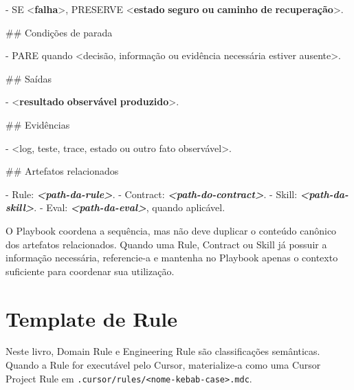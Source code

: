 \documentclass[
  10pt,
  a4paper,
  oneside]{book}
\newenvironment{Shaded}{}{}
\newcommand{\DataTypeTok}[1]{\textcolor[rgb]{0.56,0.13,0.00}{#1}}
\newcommand{\ErrorTok}[1]{\textcolor[rgb]{1.00,0.00,0.00}{\textbf{#1}}}
\newcommand{\FunctionTok}[1]{\textcolor[rgb]{0.02,0.16,0.49}{#1}}
\newcommand{\InformationTok}[1]{\textcolor[rgb]{0.38,0.63,0.69}{\textbf{\textit{#1}}}}
\newcommand{\KeywordTok}[1]{\textcolor[rgb]{0.00,0.44,0.13}{\textbf{#1}}}
\newcommand{\NormalTok}[1]{#1}
\newcommand{\SpecialStringTok}[1]{\textcolor[rgb]{0.73,0.40,0.53}{#1}}
\renewenvironment{Shaded}{\begin{snugshade}}{\end{snugshade}}%
\begin{document}
\begin{Shaded}
\begin{Highlighting}[]
\SpecialStringTok{{-} }\NormalTok{SE }\DataTypeTok{\textless{}}\KeywordTok{falha}\DataTypeTok{\textgreater{}}\NormalTok{, PRESERVE }\DataTypeTok{\textless{}}\KeywordTok{estado} \ErrorTok{seguro} \ErrorTok{ou} \ErrorTok{caminho} \ErrorTok{de} \ErrorTok{recuperação}\DataTypeTok{\textgreater{}}\NormalTok{.}

\FunctionTok{\#\# Condições de parada}

\SpecialStringTok{{-} }\NormalTok{PARE quando \textless{}decisão, informação ou evidência necessária estiver ausente\textgreater{}.}

\FunctionTok{\#\# Saídas}

\SpecialStringTok{{-} }\DataTypeTok{\textless{}}\KeywordTok{resultado} \ErrorTok{observável} \ErrorTok{produzido}\DataTypeTok{\textgreater{}}\NormalTok{.}

\FunctionTok{\#\# Evidências}

\SpecialStringTok{{-} }\NormalTok{\textless{}log, teste, trace, estado ou outro fato observável\textgreater{}.}

\FunctionTok{\#\# Artefatos relacionados}

\SpecialStringTok{{-} }\NormalTok{Rule: }\InformationTok{\textasciigrave{}\textless{}path{-}da{-}rule\textgreater{}\textasciigrave{}}\NormalTok{.}
\SpecialStringTok{{-} }\NormalTok{Contract: }\InformationTok{\textasciigrave{}\textless{}path{-}do{-}contract\textgreater{}\textasciigrave{}}\NormalTok{.}
\SpecialStringTok{{-} }\NormalTok{Skill: }\InformationTok{\textasciigrave{}\textless{}path{-}da{-}skill\textgreater{}\textasciigrave{}}\NormalTok{.}
\SpecialStringTok{{-} }\NormalTok{Eval: }\InformationTok{\textasciigrave{}\textless{}path{-}da{-}eval\textgreater{}\textasciigrave{}}\NormalTok{, quando aplicável.}
\end{Highlighting}
\end{Shaded}

O Playbook coordena a sequência, mas não deve duplicar o conteúdo
canônico dos artefatos relacionados. Quando uma Rule, Contract ou Skill
já possuir a informação necessária, referencie-a e mantenha no Playbook
apenas o contexto suficiente para coordenar sua utilização.

\hypertarget{template-de-rule}{%
\section{Template de Rule}\label{template-de-rule}}

Neste livro, Domain Rule e Engineering Rule são classificações
semânticas. Quando a Rule for executável pelo Cursor, materialize-a como
uma Cursor Project Rule em
\texttt{.cursor/rules/\textless{}nome-kebab-case\textgreater{}.mdc}.
\end{document}
